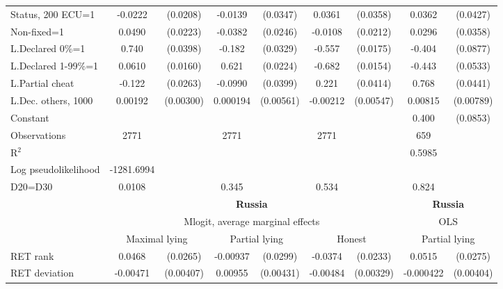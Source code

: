\begin{tabular}{l|cccccc|cc}
Status, 200 ECU=1&  -0.0222         & (0.0208)&  -0.0139         & (0.0347)&   0.0361         & (0.0358)&   0.0362         & (0.0427)\\
Non-fixed=1     &   0.0490\sym{**} & (0.0223)&  -0.0382         & (0.0246)&  -0.0108         & (0.0212)&   0.0296         & (0.0358)\\
L.Declared 0\%=1&    0.740\sym{***}& (0.0398)&   -0.182\sym{***}& (0.0329)&   -0.557\sym{***}& (0.0175)&   -0.404\sym{***}& (0.0877)\\
L.Declared 1-99\%=1&   0.0610\sym{***}& (0.0160)&    0.621\sym{***}& (0.0224)&   -0.682\sym{***}& (0.0154)&   -0.443\sym{***}& (0.0533)\\
L.Partial cheat &   -0.122\sym{***}& (0.0263)&  -0.0990\sym{**} & (0.0399)&    0.221\sym{***}& (0.0414)&    0.768\sym{***}& (0.0441)\\
L.Dec. others, 1000&  0.00192         &(0.00300)& 0.000194         &(0.00561)& -0.00212         &(0.00547)&  0.00815         &(0.00789)\\
Constant        &                  &         &                  &         &                  &         &    0.400\sym{***}& (0.0853)\\
\hline
Observations    &     2771         &         &     2771         &         &     2771         &         &      659         &         \\
R$^2$      &                  &         &                  &         &                  &         &        0.5985        &   \\ 
Log pseudolikelihood  & -1281.6994   &         &                  &         &                  &         &           &   \\ 
D20=D30         &   0.0108         &         &    0.345         &         &    0.534         &         &    0.824         &         \\
\hline\hline
&\multicolumn{6}{c|}{\bf Russia}&\multicolumn{2}{c}{\bf Russia}\\ &\multicolumn{6}{c|}{Mlogit, average marginal effects }&\multicolumn{2}{c}{OLS}\\
                &\multicolumn{2}{c}{Maximal lying}&\multicolumn{2}{c}{Partial lying}&\multicolumn{2}{c}{Honest}  &\multicolumn{2}{c}{Partial lying}\\
\hline
RET rank        &   0.0468\sym{*}  & (0.0265)& -0.00937         & (0.0299)&  -0.0374         & (0.0233)&   0.0515\sym{*}  & (0.0275)\\
RET deviation   & -0.00471         &(0.00407)&  0.00955\sym{**} &(0.00431)& -0.00484         &(0.00329)&-0.000422         &(0.00404)\\

\end{tabular}
